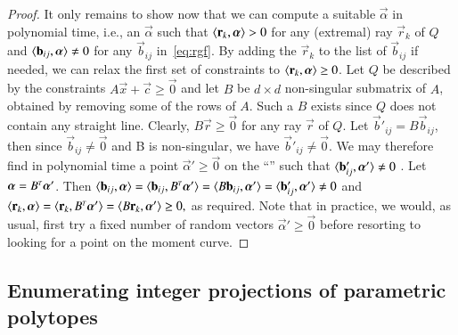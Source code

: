 \begin{proof}
It only remains to show now that we can compute a suitable $\vec \alpha$
in polynomial time, i.e., an $\vec \alpha$ such that
$\sps {\vec r_k} {\vec \alpha} > 0$ for any (extremal) ray $\vec r_k$ of $Q$ and
$\sps {\vec b_{i j}} {\vec \alpha} \ne 0$ for any
$\vec b_{i j}$ in~\eqref{eq:rgf}.
By adding the $\vec r_k$ to the list of $\vec b_{i j}$ if needed, we can relax
the first set of constraints to $\sps {\vec r_k} {\vec \alpha} \ge 0$.
Let $Q$ be described by the constraints $A \vec x + \vec c \ge \vec 0$
and let $B$ be $d \times d$ non-singular submatrix of $A$, obtained
by removing some of the rows of $A$.  Such a $B$ exists since
$Q$ does not contain any straight line.
Clearly, $B \vec r \ge \vec 0$ for any ray $\vec r$ of $Q$.
Let $\vec b'_{i j} = B \vec b_{i j}$, then since $\vec b_{i j} \ne \vec 0$
and B is non-singular, we have $\vec b'_{i j} \ne \vec 0$.
We may therefore find in polynomial time a point $\vec \alpha' \ge \vec 0$
on the ``'' such that
$\sps {\vec b'_{i j}} {\vec \alpha'} \ne 0$
.
Let $\vec \alpha = B^\T \vec \alpha'$.
Then
$
\sps {\vec b_{i j}} {\vec \alpha}
=
\sps {\vec b_{i j}} {B^\T \vec \alpha'}
=
\sps {B \vec b_{i j}} {\vec \alpha'}
=
\sps {\vec b'_{i j}} {\vec \alpha'}
\ne 0
$
and
$
\sps {\vec r_k} {\vec \alpha}
=
\sps {\vec r_k} {B^\T \vec \alpha'}
=
\sps {B \vec r_k} {\vec \alpha'}
\ge 0
,
$
as required.
Note that in practice, we would, as usual, first try a
fixed number of random vectors $\vec \alpha' \ge \vec 0$
before resorting to looking for a point on the moment curve.
\end{proof}


\subsection{Enumerating integer projections of parametric polytopes}
\label{s:projection}

